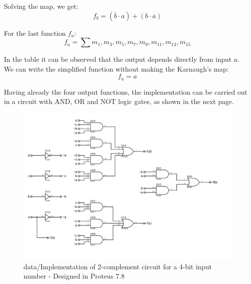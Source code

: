         Solving the map, we get:
        \[
            \boxed{f_b=(\overline{b} \cdot a)+(b \cdot \overline{a})}    
        \]\par
        For the last function $f_a$:
        \[
            f_{a}=\sum{m_1,m_3,m_5,m_7,m_9,m_{11},m_{13},m_{15}}    
        \]\par
        In the table it can be observed that the output depends 
        directly from input $a$. We can write the simplified 
        function without making the Karnaugh's map:
        \[
            \boxed{f_a=a}    
        \]
        \par
        Having already the four output functions, the implementation
        can be carried out in a circuit with AND, OR and NOT logic gates,
        as shown in the next page.
        \newpage
        \begin{figure}[H]
            \begin{centering}
            \includegraphics[width=1\textwidth]{data/ImplementacionEj4}
            \par\end{centering}
            \caption{data/Implementation of 2-complement circuit for a 4-bit input number - Designed in Proteus 7.8}
        \end{figure}
        
